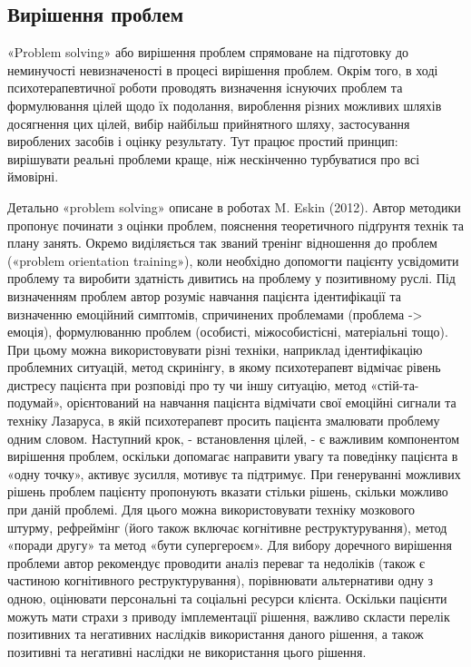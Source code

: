 \documentclass[twocolumn]{article}
\begin{document}
\subsection{Вирішення проблем}
\par «Problem solving» або вирішення проблем спрямоване на підготовку до неминучості невизначеності в процесі вирішення проблем\cite{bib22}. Окрім того, в ході психотерапевтичної роботи проводять визначення існуючих проблем та формулювання цілей щодо їх подолання, вироблення різних можливих шляхів досягнення цих цілей, вибір найбільш прийнятного шляху, застосування вироблених засобів і оцінку результату\cite{bib23}. Тут працює простий принцип: вирішувати реальні проблеми краще, ніж нескінченно турбуватися про всі ймовірні.
\par Детально «problem solving» описане в роботах M. Eskin (2012). Автор методики пропонує починати з оцінки проблем, пояснення теоретичного підґрунтя технік та плану занять. Окремо виділяється так званий тренінг відношення до проблем («problem orientation training»), коли необхідно допомогти пацієнту усвідомити проблему та виробити здатність дивитись на проблему у позитивному руслі. Під визначенням проблем автор розуміє навчання пацієнта ідентифікації та визначенню емоційний симптомів, спричинених проблемами (проблема -\textgreater{} емоція), формулюванню проблем (особисті, міжособистісні, матеріальні тощо). При цьому можна використовувати різні техніки, наприклад ідентифікацію проблемних ситуацій, метод скринінгу, в якому психотерапевт відмічає рівень дистресу пацієнта при розповіді про ту чи іншу ситуацію, метод «стій-та-подумай», орієнтований на навчання пацієнта відмічати свої емоційні сигнали та техніку Лазаруса, в якій психотерапевт просить пацієнта змалювати проблему одним словом. Наступний крок, - встановлення цілей, - є важливим компонентом вирішення проблем, оскільки допомагає направити увагу та поведінку пацієнта в «одну точку», активує зусилля, мотивує та підтримує. При генеруванні можливих рішень проблем пацієнту пропонують вказати стільки рішень, скільки можливо при даній проблемі. Для цього можна використовувати техніку мозкового штурму, рефреймінг (його також включає когнітивне реструктурування), метод «поради другу» та метод «бути супергероєм». Для вибору доречного вирішення проблеми автор рекомендує проводити аналіз переваг та недоліків (також є частиною когнітивного реструктурування), порівнювати альтернативи одну з одною, оцінювати персональні та соціальні ресурси клієнта. Оскільки пацієнти  можуть мати страхи з приводу імплементації рішення, важливо скласти перелік позитивних та негативних наслідків використання даного рішення, а також позитивні та негативні наслідки не використання цього рішення\cite{bib24}.
\end{document}
